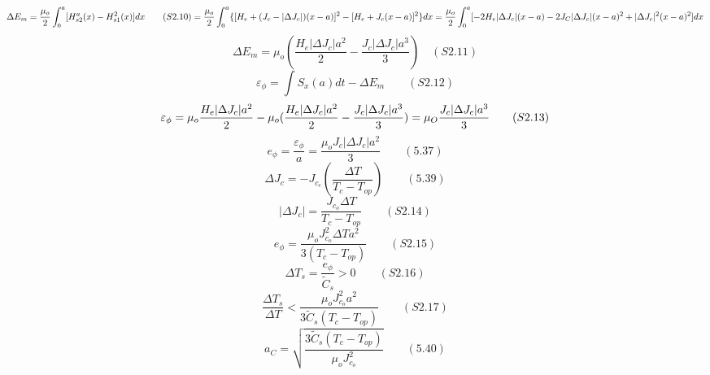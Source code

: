\begin{equation}%
\Delta E_{m}=\frac{\mu_{o}}{2}\int_{0}^{a}[H_{s2}^{a}(x)-H_{s1}^{2}(x)]dx\qquad(S2.10)\\
=\frac{\mu_{o}}{2}\int_{0}^{a}\{[H_{e}+(J_{c}-|\Delta J_{c}|)(x-a)]^{2}-[H_{e}+J_{c}(x-a)]^{2}\}dx
=\frac{\mu_{o}}{2}\int_{0}^{a}[-2H_{e}|\Delta J_{c}|(x-a)-2J_{C}|\Delta J_{c}|(x-a)^{2}+|\Delta J_{c}|^{2}(x-a)^{2}]dx
\end{equation}
\begin{equation}%
\Delta E_{m}=\mu_{o}(\frac{H_{e}|\Delta J_{c}|a^{2}}{2}-\frac{J_{c}|\Delta J_{c}|a^{3}}{3})\quad(S2.11)
\end{equation}
\begin{equation}%
\varepsilon_{\phi}=\int S_{x}(a)dt-\Delta E_{m}\qquad(S2.12)
\end{equation}
\begin{equation}%
\varepsilon_{\phi}=\mu_{o}\frac{H_{e}|\Delta J_{c}|a^{2}}{2}-\mu_{o}(\frac{H_{e}|\Delta J_{c}|a^{2}}{2}-\frac{J_{c}|\Delta J_{c}|a^{3}}{3})\\
=\mu_{O}\frac{J_{c}|\Delta J_{c}|a^{3}}{3}\qquad(S2.13)
\end{equation}
\begin{equation}%
e_{\phi}=\frac{              \varepsilon_{\phi}}{a}=\frac{\mu_{o}J_{c}|\Delta J_{c}|a^{2}}{3}\qquad(5.37)
\end{equation}
\begin{equation}%
\Delta J_{c}=-J_{c_{c}}(\frac{\Delta T}{T_{c}-T_{op}})\qquad(5.39)
\end{equation}
\begin{equation}%
|\Delta J_{c}|=\frac{J_{c_{o}}\Delta T}{T_{c}-T_{op}}\qquad(S2.14)
\end{equation}
\begin{equation}%
e_{\phi}=\frac{\mu_{o}J_{c_{o}}^{2}\Delta T a^{2}}{3(T_{c}-T_{op})}\qquad(S2.15)
\end{equation}
\begin{equation}%
\Delta T_{s}=\frac{e_{\phi}}{\tilde{C}_{s}}>0\qquad(S2.16)
\end{equation}
\begin{equation}%
\frac{\Delta T_{s}}{\Delta T}<\frac{\mu_{o}J_{c_{o}}^{2}a^{2}}{3\tilde{C}_{s}(T_{c}-T_{op})}\qquad(S2.17)
\end{equation}
\begin{equation}%
a_{C}=\sqrt{\frac{3\tilde{C}_{s}(T_{c}-T_{op})}{\mu_{o}J_{c_{o}}^{2}}}\qquad(5.40)
\end{equation}

